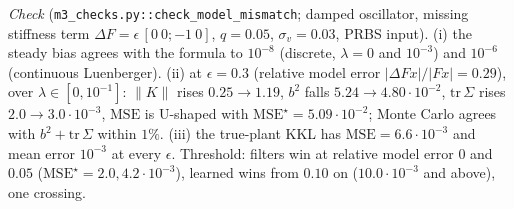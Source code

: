 \emph{Check} (\texttt{m3\_checks.py::check\_model\_mismatch}; damped oscillator, missing stiffness term
$\Delta F=\epsilon\,[0\ 0;-1\ 0]$, $q=0.05$, $\sigma_v=0.03$, PRBS input). (i) the steady bias agrees with the formula to
$10^{-8}$ (discrete, $\lambda=0$ and $10^{-3}$) and $10^{-6}$ (continuous Luenberger). (ii) at $\epsilon=0.3$
(relative model error $|\Delta Fx|/|Fx|=0.29$), over $\lambda\in[0,10^{-1}]$: $\|K\|$ rises $0.25\to1.19$, $b^2$ falls
$5.24\to4.80\cdot10^{-2}$, $\mathrm{tr}\,\Sigma$ rises $2.0\to3.0\cdot10^{-3}$, $\mathrm{MSE}$ is U-shaped with
$\mathrm{MSE}^\star=5.09\cdot10^{-2}$; Monte Carlo agrees with $b^2+\mathrm{tr}\,\Sigma$ within $1\%$. (iii) the
true-plant KKL has $\mathrm{MSE}=6.6\cdot10^{-3}$ and mean error $10^{-3}$ at every $\epsilon$. Threshold: filters win at
relative model error $0$ and $0.05$ ($\mathrm{MSE}^\star=2.0,4.2\cdot10^{-3}$), learned wins from $0.10$ on
($10.0\cdot10^{-3}$ and above), one crossing.

